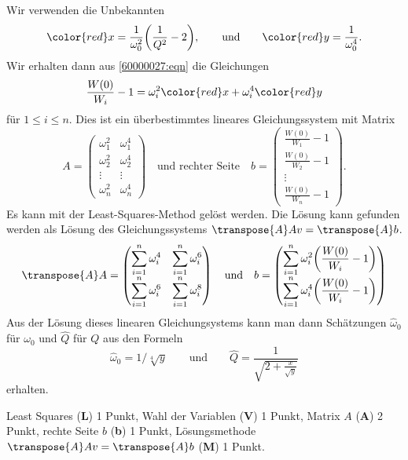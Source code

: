 \begin{loesung}
Wir verwenden die Unbekannten 
\[
{\color{red}x}=\frac{1}{\omega_0^2}\biggl(\frac{1}{Q^2}-2 \biggr),
\qquad\text{und}\qquad
{\color{red}y}=\frac{1}{\omega_0^4}.
\]
Wir erhalten dann aus \eqref{60000027:eqn} die Gleichungen
\begin{equation}
\frac{W(0)}{W_i}-1
=
\omega_i^2 {\color{red}x}
+
\omega_i^4 {\color{red}y}
\end{equation}
für $1\le i\le n$.
Dies ist ein überbestimmtes lineares Gleichungssystem mit Matrix
\[
A=\begin{pmatrix}
\omega_1^2&\omega_1^4\\
\omega_2^2&\omega_2^4\\
\vdots   &\vdots    \\
\omega_n^2&\omega_n^4
\end{pmatrix}
\quad\text{und rechter Seite}\quad
b=\begin{pmatrix}
\frac{W(0)}{W_1}-1\\
\frac{W(0)}{W_2}-1\\
\vdots\\
\frac{W(0)}{W_n}-1
\end{pmatrix}.
\]
Es kann mit der Least-Squares-Method gelöst werden.
Die Lösung kann gefunden werden als Lösung des Gleichungssystems
$\transpose{A}Av=\transpose{A}b$.
\[
\transpose{A}A
=
\begin{pmatrix}
\displaystyle\sum_{i=1}^n \omega_i^4 & \displaystyle\sum_{i=1}^n \omega_i^6 \\
\displaystyle\sum_{i=1}^n \omega_i^6 & \displaystyle\sum_{i=1}^n \omega_i^8
\end{pmatrix}
\quad\text{und}\quad
b
=
\begin{pmatrix}
\displaystyle\sum_{i=1}^n \omega_i^2 \biggl(\frac{W(0)}{W_i}-1\biggr) \\
\displaystyle\sum_{i=1}^n \omega_i^4 \biggl(\frac{W(0)}{W_i}-1\biggr)
\end{pmatrix}
\]
Aus der Lösung dieses linearen Gleichungsystems kann man dann 
Schätzungen $\hat{\omega}_0$ für $\omega_0$ und $\hat{Q}$ für $Q$
aus den Formeln
\[
\hat{\omega}_0
=
1/\sqrt[4]{y}
\qquad\text{und}\qquad
\hat{Q}
=
\frac1{\displaystyle\sqrt{2+\frac{x}{\sqrt{y}}}}
\]
erhalten.
\end{loesung}

\begin{bewertung}
Least Squares ({\bf L}) 1 Punkt,
Wahl der Variablen ({\bf V}) 1 Punkt,
Matrix $A$ ({\bf A}) 2 Punkt,
rechte Seite $b$ ({\bf b}) 1 Punkt,
Lösungsmethode $\transpose{A}Av=\transpose{A}b$ ({\bf M}) 1 Punkt.
\end{bewertung}

